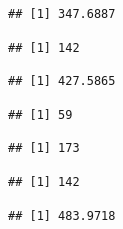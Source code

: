 \documentclass[]{article}
\begin{document}
\begin{verbatim}
## [1] 347.6887
\end{verbatim}

\begin{verbatim}
## [1] 142
\end{verbatim}

\begin{verbatim}
## [1] 427.5865
\end{verbatim}

\begin{verbatim}
## [1] 59
\end{verbatim}

\begin{verbatim}
## [1] 173
\end{verbatim}

\begin{verbatim}
## [1] 142
\end{verbatim}

\begin{verbatim}
## [1] 483.9718
\end{verbatim}
\end{document}
